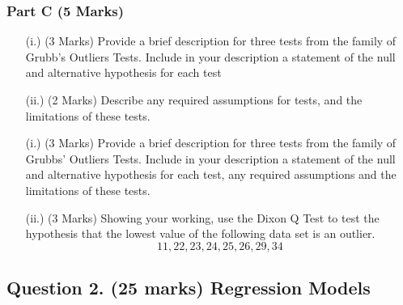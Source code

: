\documentclass[a4paper,12pt]{article}
\begin{document}
%


\subsubsection*{Part C (5 Marks)}

\begin{itemize}
	\item[(i.)] (3 Marks) Provide a brief description for three tests from the family of Grubb's  Outliers Tests. Include in your description a statement of the null and alternative hypothesis for each test
	\item[(ii.)] (2 Marks) Describe any required assumptions for tests, and the limitations of these tests.
		\item[(i.)] (3 Marks) Provide a brief description for three tests from the family of Grubbs'  Outliers Tests. Include in your description a statement of the null and alternative hypothesis for each test, any required assumptions and the limitations of these tests.
		\item[(ii.)] (3 Marks) Showing your working, use the Dixon Q Test to test the hypothesis that the lowest value of the following data set is an outlier.
		\[ 11,22,23,24,25,26,29,34\]
\end{itemize}










\newpage
\subsection*{Question 2. (25 marks) Regression Models }
\end{document}
